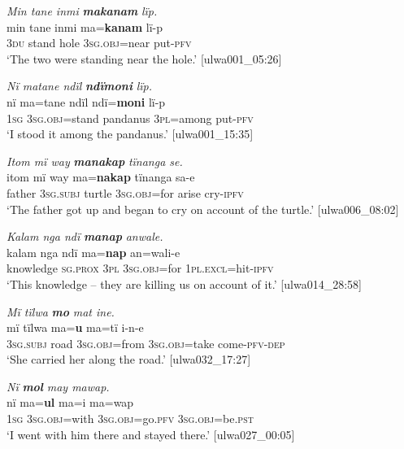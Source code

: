 \ea%
    \label{ex:otherwc:13}
          \textit{Min tane inmi} \textbf{\textit{makanam}} \textit{lïp.}\\
\gll    min  tane  inmi  ma=\textbf{kanam}  lï-p\\
    3\textsc{du}  stand  hole  3\textsc{sg.obj}=near  put-\textsc{pfv}\\
\glt `The two were standing near the hole.’ [ulwa001\_05:26]
\z

\ea%
    \label{ex:otherwc:14}
          \textit{Nï matane ndïl} \textbf{\textit{ndïmoni}} \textit{lïp.}\\
\gll    nï    ma=tane    ndïl    ndï=\textbf{moni}    lï-p\\
    1\textsc{sg}  3\textsc{sg.obj}=stand  pandanus  3\textsc{pl}=among  put-\textsc{pfv}\\
\glt `I stood it among the pandanus.’ [ulwa001\_15:35]
\z


\ea%
    \label{ex:otherwc:15}
          \textit{Itom mï way} \textbf{\textit{manakap}} \textit{tïnanga se.}\\
\gll    itom  mï      way  ma=\textbf{nakap}  tïnanga  sa-e\\
    father  \textsc{3sg.subj}  turtle  3\textsc{sg.obj}=for  arise  cry-\textsc{ipfv}\\
\glt `The father got up and began to cry on account of the turtle.’ [ulwa006\_08:02]
\z

\ea%
    \label{ex:otherwc:16}
          \textit{Kalam nga ndï} \textbf{\textit{manap}} \textit{anwale.}\\
\gll    kalam    nga      ndï  ma=\textbf{nap}    an=wali-e\\
    knowledge  \textsc{sg.prox}  \textsc{3pl}  \textsc{3sg.obj}=for  1\textsc{pl.excl}=hit-\textsc{ipfv}\\
\glt `This knowledge -- they are killing us on account of it.’ [ulwa014\_28:58]
\z

\ea%
    \label{ex:otherwc:17}
          \textit{Mï tïlwa} \textbf{\textit{mo}} \textit{mat ine.}\\
\gll    mï      tïlwa  ma=\textbf{u}      ma=tï      i-n-e\\
    3\textsc{sg.subj}  road  3\textsc{sg.obj}=from  3\textsc{sg.obj}=take  come-\textsc{pfv-dep}\\
\glt `She carried her along the road.’ [ulwa032\_17:27]
\z

\ea%
    \label{ex:otherwc:18}
          \textit{Nï} \textbf{\textit{mol}} \textit{may mawap.}\\
\gll    nï    ma=\textbf{ul}      ma=i        ma=wap\\
    1\textsc{sg}  3\textsc{sg.obj}=with  3\textsc{sg.obj}=go.\textsc{pfv}  3\textsc{sg.obj}=be.\textsc{pst}\\
\glt `I went with him there and stayed there.’ [ulwa027\_00:05]
\z

